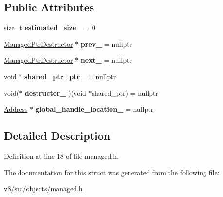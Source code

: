 \subsection*{Public Attributes}
\begin{DoxyCompactItemize}
\item 
\mbox{\label{structv8_1_1internal_1_1ManagedPtrDestructor_acb7a3f729d0c74598af704d93e7ba023}} 
\mbox{\hyperlink{classsize__t}{size\+\_\+t}} {\bfseries estimated\+\_\+size\+\_\+} = 0
\item 
\mbox{\label{structv8_1_1internal_1_1ManagedPtrDestructor_a03534f65691c4bdb03061af7236fd103}} 
\mbox{\hyperlink{structv8_1_1internal_1_1ManagedPtrDestructor}{Managed\+Ptr\+Destructor}} $\ast$ {\bfseries prev\+\_\+} = nullptr
\item 
\mbox{\label{structv8_1_1internal_1_1ManagedPtrDestructor_a354e6d496d6c0a8022286d438609ab31}} 
\mbox{\hyperlink{structv8_1_1internal_1_1ManagedPtrDestructor}{Managed\+Ptr\+Destructor}} $\ast$ {\bfseries next\+\_\+} = nullptr
\item 
\mbox{\label{structv8_1_1internal_1_1ManagedPtrDestructor_abe77ff1fcda1722a3a959e7eb68a5190}} 
void $\ast$ {\bfseries shared\+\_\+ptr\+\_\+ptr\+\_\+} = nullptr
\item 
\mbox{\label{structv8_1_1internal_1_1ManagedPtrDestructor_a1e4db372477df960509f0271eb83c040}} 
void($\ast$ {\bfseries destructor\+\_\+} )(void $\ast$shared\+\_\+ptr) = nullptr
\item 
\mbox{\label{structv8_1_1internal_1_1ManagedPtrDestructor_a05a32cddd9ce0507f92882ea91ec42cf}} 
\mbox{\hyperlink{classuintptr__t}{Address}} $\ast$ {\bfseries global\+\_\+handle\+\_\+location\+\_\+} = nullptr
\end{DoxyCompactItemize}


\subsection{Detailed Description}


Definition at line 18 of file managed.\+h.



The documentation for this struct was generated from the following file\+:\begin{DoxyCompactItemize}
\item 
v8/src/objects/managed.\+h\end{DoxyCompactItemize}
